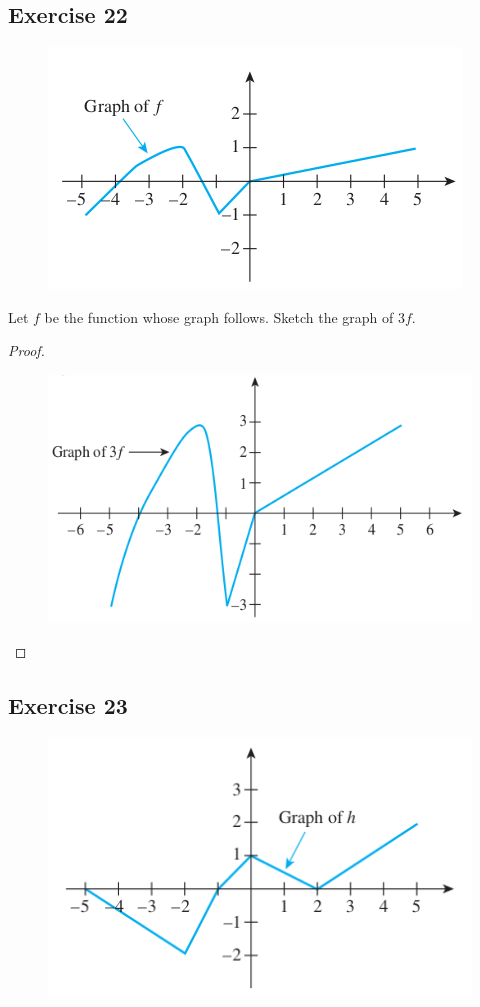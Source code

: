 \documentclass[14pt]{extarticle}
\begin{document}
\subsection{Exercise 22}
\begin{figure}[ht!]
    \centering
    \includegraphics[scale=0.5]{../images/11.1.22.png}
\end{figure}

Let \(f\) be the function whose graph follows. Sketch the graph of \(3f\).

\begin{proof}
    \begin{figure}[ht!]
        \centering
        \includegraphics[scale=0.5]{../images/11.1.22.2.png}
    \end{figure}
\end{proof}

\subsection{Exercise 23}
\begin{figure}[ht!]
    \centering
    \includegraphics[scale=0.5]{../images/11.1.23.png}
\end{figure}
\end{document}
